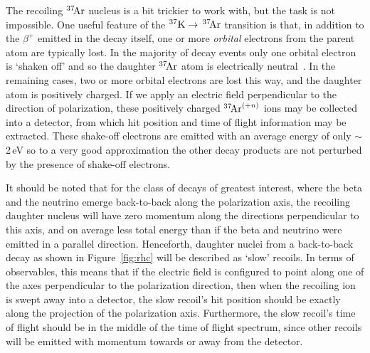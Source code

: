 The recoiling $^{37}\textrm{\!Ar}$ nucleus is a bit trickier to work with, but the task is not impossible.  One useful feature of the $^{37}\textrm{K} \rightarrow \,^{37}\textrm{\!Ar}$ transition is that, in addition to the $\beta^+$ emitted in the decay itself, one or more \emph{orbital} electrons from the parent atom are typically lost.  In the majority of decay events
only one orbital electron is `shaken off' and so the daughter $^{37}\textrm{\!Ar}$ atom is electrically neutral~\cite{gorelov2000}\cite{dan_thesis}.  In the remaining cases, two or more orbital electrons are lost this way, and the daughter atom is positively charged.  If we apply an electric field perpendicular to the direction of polarization, these positively charged $^{37}\textrm{\!Ar}^{(+n)}$ ions may be collected into a detector, from which hit position and time of flight information may be extracted.  These shake-off electrons are emitted with an average energy of only $\sim$ 2\,eV
so to a very good approximation the other decay products are not perturbed by the presence of shake-off electrons.  

It should be noted that for the class of decays of greatest interest, where the beta and the neutrino emerge back-to-back along the polarization axis, the recoiling daughter nucleus will have zero momentum along the directions perpendicular to this axis, and on average less total energy than if the beta and neutrino were emitted in a parallel direction.  Henceforth, daughter nuclei from a back-to-back decay as shown in Figure~\ref{fig:rhc} will be described as `slow' recoils.  In terms of observables, this means that if the electric field is configured to point along one of the axes perpendicular to the polarization direction, then when the recoiling ion is swept away into a detector, the slow recoil's hit position should be exactly along the projection of the polarization axis.  Furthermore, the slow recoil's time of flight should be in the middle of the time of flight spectrum, since other recoils will be emitted with momentum towards or away from the detector.  


